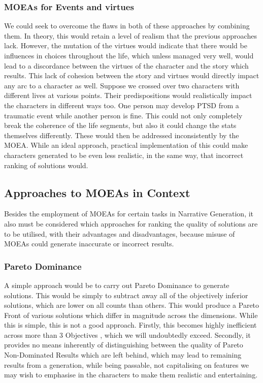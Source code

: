 \documentclass[11pt]{article}
\begin{document}
\subsubsection{MOEAs for Events and virtues} 
We could seek to overcome the flaws in both of these approaches by combining them. In theory, this would retain a level of realism that the previous approaches lack. However, the mutation of the virtues would indicate that there would be influences in choices throughout the life, which unless managed very well, would lead to a discordance between the virtues of the character and the story which results. This lack of cohesion between the story and virtues would directly impact any arc to a character as well. Suppose we crossed over two characters with different lives at various points. Their predispositions would realistically impact the characters in different ways too. One person may develop PTSD from a traumatic event while another person is fine. This could not only completely break the coherence of the life segments, but also it could change the stats themselves differently. These would then be addressed inconsistently by the MOEA. While an ideal approach, practical implementation of this could make characters generated to be even less realistic, in the same way, that incorrect ranking of solutions would.\\
\subsection{Approaches to MOEAs in Context}
Besides the employment of MOEAs for certain tasks in Narrative Generation, it also must be considered which approaches for ranking the quality of solutions are to be utilised, with their advantages and disadvantages, because misuse of MOEAs could generate inaccurate or incorrect results.\\
\subsubsection{Pareto Dominance}
A simple approach would be to carry out Pareto Dominance to generate solutions. This would be simply to subtract away all of the objectively inferior solutions, which are lower on all counts than others. This would produce a Pareto Front of various solutions which differ in magnitude across the dimensions. While this is simple, this is not a good approach. Firstly, this becomes highly inefficient across more than 3 Objectives \cite{AchievementScalarazingIndicatorBased}, which we will undoubtedly exceed. Secondly, it provides no means inherently of distinguishing between the quality of Pareto Non-Dominated Results which are left behind, which may lead to remaining results from a generation, while being passable, not capitalising on features we may wish to emphasise in the characters to make them realistic and entertaining.\\ 
\end{document}
